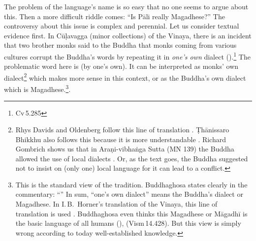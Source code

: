 The problem of the language's name is so easy that no one seems to argue about this. Then a more difficult riddle comes: ``Is P\=ali really Magadhese?'' The controversy about this issue is complex and perennial. Let us consider textual evidence first. In C\=u\d lavagga (minor collections) of the Vinaya, there is an incident that two brother monks said to the Buddha that monks coming from various cultures corrupt the Buddha's words by repeating it in \emph{one's own} dialect ().\footnote{Cv\,5.285} The problematic word here is  (by one's own). It can be interpreted as monks' own dialect\footnote{Rhys Davids and Oldenberg follow this line of translation \citep[p.~150]{rhys:vinaya3}. \d Th\=anissaro Bhikkhu also follows this because it is more understandable \citep[p.~745]{thanissaro:code}. Richard Gombrich shows us that in Ara\d ni-vibha\.nga Sutta (MN 139) the Buddha allowed the use of local dialects \citep[p.~147]{gombrich:what}. Or, as the text goes, the Buddha suggested not to insist on (only one) local language for it can lead to a conflict.} which makes more sense in this context, or as the Buddha's own dialect which is Magadhese.\footnote{This is the standard view of the tradition. Buddhaghosa states clearly in the commentary: ``'' In sum, ``one's own dialect'' means the Buddha's dialect or Magadhese. In I.\,B.\ Horner's translation of the Vinaya, this line of translation is used \citep[p.~2171]{horner:discipline}. Buddhaghosa even thinks this Magadhese or M\=agadh\=i is the basic language of all humans (), \citealp[see][p.~437:\S XIV.25]{buddhaghosa:visud} (Vism\,14.428). But this view is simply wrong according to today well-established knowledge. }.


